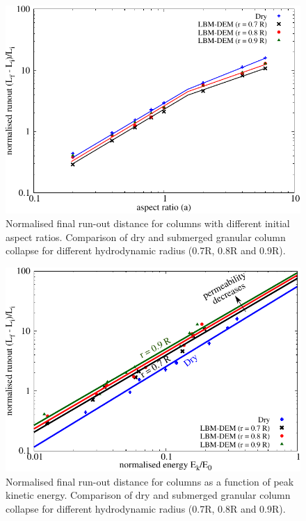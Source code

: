 \begin{figure}[tbhp]
	\centering
	\includegraphics[width=\textwidth]{runout_fluid_dry}
	\caption{Normalised final run-out distance for columns with different 
	initial aspect ratios. Comparison of dry and submerged granular column 
	collapse for different hydrodynamic radius (0.7R, 0.8R and 0.9R).}
	\label{fig:runout_fluid_dry}
\end{figure}

\begin{figure}[tbhp]
	\centering
	\includegraphics[width=\textwidth]{runout_fluid_dry_energy}
	\caption{Normalised final run-out distance for columns as a function of 
	peak kinetic energy. Comparison of dry and submerged granular column 
	collapse for different hydrodynamic radius (0.7R, 0.8R and 0.9R).}
	\label{fig:runout_fluid_dry_energy}
\end{figure}

